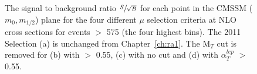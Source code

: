 \begin{figure}[htbp]
\centering
{}
\caption{\label{fig:4sb}The signal to background ratio $\sfrac{S}{\sqrt{B}}$ for each point in the CMSSM ($m_{0},m_{1/2}$) plane for the four different $\mu$ selection criteria at NLO cross sections for events \HT $>$ 575 (the four highest bins). The 2011 Selection (a) is unchanged from Chapter~\ref{ch:ra1}. The M$_{T}$ cut is removed for (b) with \alt $>$ 0.55, (c) with no \alt cut and (d) with $\alpha^{lep}_{T}$ $>$ 0.55.}
\end{figure}





